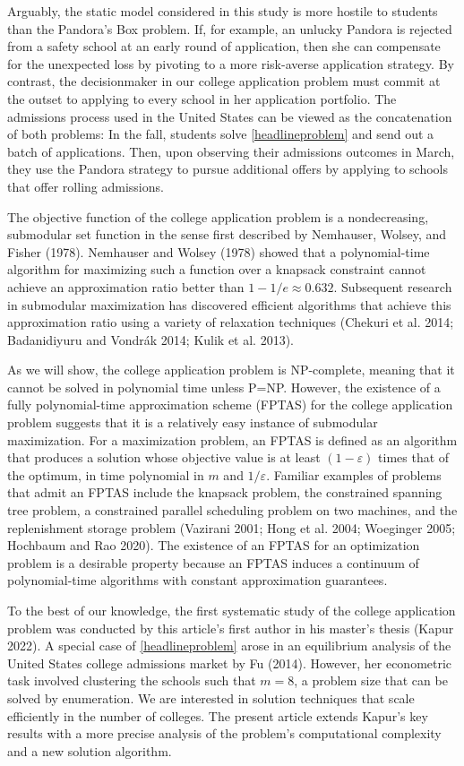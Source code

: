 \documentclass[11pt]{article} %
\theoremstyle{definition}
\begin{document}
Arguably, the static model considered in this study is more hostile to students than the Pandora's Box problem. If, for example, an unlucky Pandora is rejected from a safety school at an early round of application, then she can compensate for the unexpected loss by pivoting to a more risk-averse application strategy. By contrast, the decisionmaker in our college application problem must commit at the outset to applying to every school in her application portfolio. The admissions process used in the United States can be viewed as the concatenation of both problems: In the fall, students solve \eqref{headlineproblem} and send out a batch of applications. Then, upon observing their admissions outcomes in March, they use the Pandora strategy to pursue additional offers by applying to schools that offer rolling admissions.

The objective function of the college application problem is a nondecreasing, submodular set function in the sense first described by Nemhauser, Wolsey, and Fisher (1978). Nemhauser and Wolsey (1978) showed that a polynomial-time algorithm for maximizing such a function over a knapsack constraint cannot achieve an approximation ratio better than $1 - 1 / e \approx 0.632$. Subsequent research in submodular maximization has discovered efficient algorithms that achieve this approximation ratio using a variety of relaxation techniques (Chekuri et al. 2014; Badanidiyuru and Vondrák 2014; Kulik et al. 2013).

As we will show, the college application problem is NP-complete, meaning that it cannot be solved in polynomial time unless P=NP. However, the existence of a fully polynomial-time approximation scheme (FPTAS) for the college application problem suggests that it is a relatively easy instance of submodular maximization. For a maximization problem, an FPTAS is defined as an algorithm that produces a solution whose objective value is at least $(1 - \varepsilon)$ times that of the optimum, in time polynomial in $m$ and $1 / \varepsilon$. Familiar examples of problems that admit an FPTAS include the knapsack problem, the constrained spanning tree problem, a constrained parallel scheduling problem on two machines, and the replenishment storage problem (Vazirani 2001; Hong et al. 2004; Woeginger 2005; Hochbaum and Rao 2020). The existence of an FPTAS for an optimization problem is a desirable property because an FPTAS induces a continuum of polynomial-time algorithms with constant approximation guarantees.

To the best of our knowledge, the first systematic study of the college application problem was conducted by this article's first author in his master's thesis (Kapur 2022). A special case of \eqref{headlineproblem} arose in an equilibrium analysis of the United States college admissions market by Fu (2014). However, her econometric task involved clustering the schools such that $m=8$, a problem size that can be solved by enumeration. We are interested in solution techniques that scale efficiently in the number of colleges. The present article extends Kapur's key results with a more precise analysis of the problem's computational complexity and a new solution algorithm.
\end{document}
